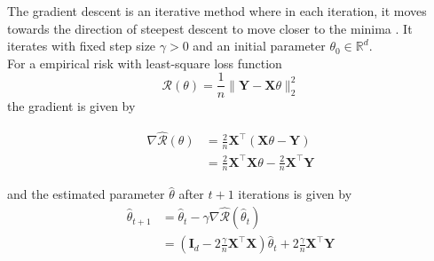 \begin{definition}
The gradient descent is an iterative method where in each iteration, it moves towards the direction of steepest descent to move closer to the minima \citep{cauchy1847gradient}. It iterates with fixed step size $\gamma > 0$ and an initial parameter $\theta_0 \in \mathbb{R}^d$.\\

For a empirical risk with least-square loss function
\begin{equation}
    \mathcal{R}(\theta) = \frac{1}{n} \lVert \mathbf{Y} - \mathbf{X}\theta \rVert_2^2
    \label{eqn:6.6}
\end{equation}
the gradient is given by

\begin{equation}
    \begin{aligned}
        \nabla \hat{\mathcal{R}}(\theta) &= \frac{2}{n} \mathbf{X}^\top (\mathbf{X}\theta - \mathbf{Y})\\
        &= \frac{2}{n} \mathbf{X}^\top\mathbf{X}\theta - \frac{2}{n} \mathbf{X}^\top\mathbf{Y}
    \end{aligned}
    \label{eqn:6.7}
\end{equation}

and the estimated parameter $\hat{\theta}$ after $t+1$ iterations is given by
\begin{equation}
    \begin{aligned}
        \hat{\theta}_{t+1} &= \hat{\theta}_t - \gamma \nabla \hat{\mathcal{R}}(\hat{\theta}_t)\\
        &= (\mathbf{I}_d - 2 \frac{\gamma}{n}\mathbf{X}^\top \mathbf{X})\hat{\theta}_t + 2 \frac{\gamma}{n} \mathbf{X}^\top \mathbf{Y}
    \end{aligned}
    \label{eqn:6.8}
\end{equation}

\end{definition}

